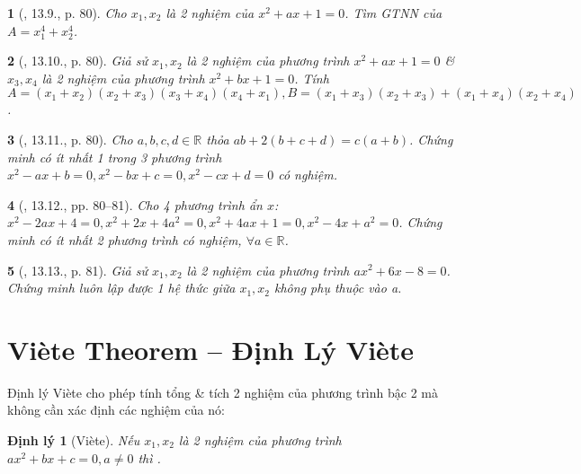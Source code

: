 \documentclass{article}
\newtheorem{baitoan}{}
\newtheorem{dinhly}{Định lý}
\begin{document}
\begin{baitoan}[\cite{TLCT_THCS_Toan_9_dai_so}, 13.9., p. 80]
	Cho $x_1,x_2$ là 2 nghiệm của $x^2 + ax + 1 = 0$. Tìm {\rm GTNN} của $A = x_1^4 + x_2^4$.
\end{baitoan}

\begin{baitoan}[\cite{TLCT_THCS_Toan_9_dai_so}, 13.10., p. 80]
	Giả sử $x_1,x_2$ là 2 nghiệm của phương trình $x^2 + ax + 1 = 0$ \& $x_3,x_4$ là 2 nghiệm của phương trình $x^2 + bx + 1 = 0$. Tính $A = (x_1 + x_2)(x_2 + x_3)(x_3 + x_4)(x_4 + x_1),B = (x_1 + x_3)(x_2 + x_3) + (x_1 + x_4)(x_2 + x_4)$.
\end{baitoan}

\begin{baitoan}[\cite{TLCT_THCS_Toan_9_dai_so}, 13.11., p. 80]
	Cho $a,b,c,d\in\mathbb{R}$ thỏa $ab + 2(b + c + d) = c(a + b)$. Chứng minh có ít nhất 1 trong 3 phương trình $x^2 - ax + b = 0,x^2 - bx + c = 0,x^2 - cx + d = 0$ có nghiệm.
\end{baitoan}

\begin{baitoan}[\cite{TLCT_THCS_Toan_9_dai_so}, 13.12., pp. 80--81]
	Cho 4 phương trình ẩn $x$: $x^2 - 2ax + 4 = 0,x^2 + 2x + 4a^2 = 0,x^2 + 4ax + 1 = 0,x^2 - 4x + a^2 = 0$. Chứng minh có ít nhất 2 phương trình có nghiệm, $\forall a\in\mathbb{R}$.
\end{baitoan}

\begin{baitoan}[\cite{TLCT_THCS_Toan_9_dai_so}, 13.13., p. 81]
	Giả sử $x_1,x_2$ là 2 nghiệm của phương trình $ax^2 + 6x - 8 = 0$. Chứng minh luôn lập được 1 hệ thức giữa $x_1,x_2$ không phụ thuộc vào a.
\end{baitoan}


\section{Vi\`ete Theorem -- Định Lý Vi\`ete}
 Định lý Vi\`ete cho phép tính tổng \& tích 2 nghiệm của phương trình bậc 2 mà không cần xác định các nghiệm của nó:

\begin{dinhly}[Vi\`ete]
	Nếu $x_1,x_2$ là 2 nghiệm của phương trình $ax^2 + bx + c = 0,a\ne0$ thì .
\end{dinhly}
\end{document}
